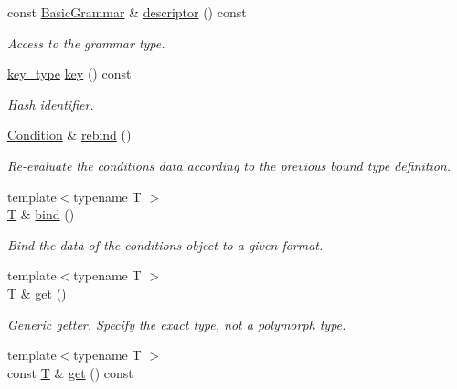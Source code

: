 \begin{DoxyCompactItemize}
const \hyperlink{class_d_d4hep_1_1_basic_grammar}{BasicGrammar} \& \hyperlink{class_d_d4hep_1_1_conditions_1_1_condition_a858566d0194945ed9b0e0de1bf2597cd}{descriptor} () const 
\begin{DoxyCompactList}\small\item\em Access to the grammar type. \item\end{DoxyCompactList}\item 
\hyperlink{class_d_d4hep_1_1_conditions_1_1_condition_a7528efa762e8cc072ef80ea67c3531f9}{key\_\-type} \hyperlink{class_d_d4hep_1_1_conditions_1_1_condition_a38db941b4934fbb36ebb7eade86593a8}{key} () const 
\begin{DoxyCompactList}\small\item\em Hash identifier. \item\end{DoxyCompactList}\item 
\hyperlink{class_d_d4hep_1_1_conditions_1_1_condition}{Condition} \& \hyperlink{class_d_d4hep_1_1_conditions_1_1_condition_affc3f86e2c713e2122dabc3372d460f0}{rebind} ()
\begin{DoxyCompactList}\small\item\em Re-\/evaluate the conditions data according to the previous bound type definition. \item\end{DoxyCompactList}\item 
{\footnotesize template$<$typename T $>$ }\\\hyperlink{class_t}{T} \& \hyperlink{class_d_d4hep_1_1_conditions_1_1_condition_a5e287f594f3d14d6a6870be8c34b65cc}{bind} ()
\begin{DoxyCompactList}\small\item\em Bind the data of the conditions object to a given format. \item\end{DoxyCompactList}\item 
{\footnotesize template$<$typename T $>$ }\\\hyperlink{class_t}{T} \& \hyperlink{class_d_d4hep_1_1_conditions_1_1_condition_af21f0921b4cd325d6cc6616747a278c9}{get} ()
\begin{DoxyCompactList}\small\item\em Generic getter. Specify the exact type, not a polymorph type. \item\end{DoxyCompactList}\item 
{\footnotesize template$<$typename T $>$ }\\const \hyperlink{class_t}{T} \& \hyperlink{class_d_d4hep_1_1_conditions_1_1_condition_a8e5ee257360520a40edf585d93874d1f}{get} () const 

\end{DoxyCompactItemize}
